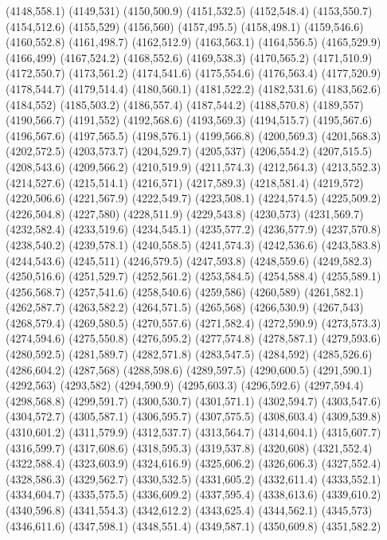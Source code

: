 (4148,558.1)
(4149,531)
(4150,500.9)
(4151,532.5)
(4152,548.4)
(4153,550.7)
(4154,512.6)
(4155,529)
(4156,560)
(4157,495.5)
(4158,498.1)
(4159,546.6)
(4160,552.8)
(4161,498.7)
(4162,512.9)
(4163,563.1)
(4164,556.5)
(4165,529.9)
(4166,499)
(4167,524.2)
(4168,552.6)
(4169,538.3)
(4170,565.2)
(4171,510.9)
(4172,550.7)
(4173,561.2)
(4174,541.6)
(4175,554.6)
(4176,563.4)
(4177,520.9)
(4178,544.7)
(4179,514.4)
(4180,560.1)
(4181,522.2)
(4182,531.6)
(4183,562.6)
(4184,552)
(4185,503.2)
(4186,557.4)
(4187,544.2)
(4188,570.8)
(4189,557)
(4190,566.7)
(4191,552)
(4192,568.6)
(4193,569.3)
(4194,515.7)
(4195,567.6)
(4196,567.6)
(4197,565.5)
(4198,576.1)
(4199,566.8)
(4200,569.3)
(4201,568.3)
(4202,572.5)
(4203,573.7)
(4204,529.7)
(4205,537)
(4206,554.2)
(4207,515.5)
(4208,543.6)
(4209,566.2)
(4210,519.9)
(4211,574.3)
(4212,564.3)
(4213,552.3)
(4214,527.6)
(4215,514.1)
(4216,571)
(4217,589.3)
(4218,581.4)
(4219,572)
(4220,506.6)
(4221,567.9)
(4222,549.7)
(4223,508.1)
(4224,574.5)
(4225,509.2)
(4226,504.8)
(4227,580)
(4228,511.9)
(4229,543.8)
(4230,573)
(4231,569.7)
(4232,582.4)
(4233,519.6)
(4234,545.1)
(4235,577.2)
(4236,577.9)
(4237,570.8)
(4238,540.2)
(4239,578.1)
(4240,558.5)
(4241,574.3)
(4242,536.6)
(4243,583.8)
(4244,543.6)
(4245,511)
(4246,579.5)
(4247,593.8)
(4248,559.6)
(4249,582.3)
(4250,516.6)
(4251,529.7)
(4252,561.2)
(4253,584.5)
(4254,588.4)
(4255,589.1)
(4256,568.7)
(4257,541.6)
(4258,540.6)
(4259,586)
(4260,589)
(4261,582.1)
(4262,587.7)
(4263,582.2)
(4264,571.5)
(4265,568)
(4266,530.9)
(4267,543)
(4268,579.4)
(4269,580.5)
(4270,557.6)
(4271,582.4)
(4272,590.9)
(4273,573.3)
(4274,594.6)
(4275,550.8)
(4276,595.2)
(4277,574.8)
(4278,587.1)
(4279,593.6)
(4280,592.5)
(4281,589.7)
(4282,571.8)
(4283,547.5)
(4284,592)
(4285,526.6)
(4286,604.2)
(4287,568)
(4288,598.6)
(4289,597.5)
(4290,600.5)
(4291,590.1)
(4292,563)
(4293,582)
(4294,590.9)
(4295,603.3)
(4296,592.6)
(4297,594.4)
(4298,568.8)
(4299,591.7)
(4300,530.7)
(4301,571.1)
(4302,594.7)
(4303,547.6)
(4304,572.7)
(4305,587.1)
(4306,595.7)
(4307,575.5)
(4308,603.4)
(4309,539.8)
(4310,601.2)
(4311,579.9)
(4312,537.7)
(4313,564.7)
(4314,604.1)
(4315,607.7)
(4316,599.7)
(4317,608.6)
(4318,595.3)
(4319,537.8)
(4320,608)
(4321,552.4)
(4322,588.4)
(4323,603.9)
(4324,616.9)
(4325,606.2)
(4326,606.3)
(4327,552.4)
(4328,586.3)
(4329,562.7)
(4330,532.5)
(4331,605.2)
(4332,611.4)
(4333,552.1)
(4334,604.7)
(4335,575.5)
(4336,609.2)
(4337,595.4)
(4338,613.6)
(4339,610.2)
(4340,596.8)
(4341,554.3)
(4342,612.2)
(4343,625.4)
(4344,562.1)
(4345,573)
(4346,611.6)
(4347,598.1)
(4348,551.4)
(4349,587.1)
(4350,609.8)
(4351,582.2)
